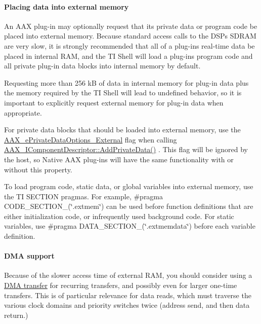 \hypertarget{a00362_subsubsection__placing_data_into_external_memory_}{}\paragraph{Placing data into external memory}\label{a00362_subsubsection__placing_data_into_external_memory_}
 An A\+A\+X plug-\/in may optionally request that its private data or program code be placed into external memory. Because standard access calls to the D\+S\+P\textquotesingle{}s S\+D\+R\+A\+M are very slow, it is strongly recommended that all of a plug-\/in\textquotesingle{}s real-\/time data be placed in internal R\+A\+M, and the T\+I Shell will load a plug-\/in\textquotesingle{}s program code and all private plug-\/in data blocks into internal memory by default.

Requesting more than 256 k\+B of data in internal memory for plug-\/in data plus the memory required by the T\+I Shell will lead to undefined behavior, so it is important to explicitly request external memory for plug-\/in data when appropriate.

For private data blocks that should be loaded into external memory, use the \hyperlink{a00206_a9f1ef2cb64daf30eaf145dfbb8cd0d00a75aef62fea40f9bba18502add99130b2}{A\+A\+X\+\_\+e\+Private\+Data\+Options\+\_\+\+External} flag when calling \hyperlink{a00088_a125949841a13e97ff93fa321f2050433}{A\+A\+X\+\_\+\+I\+Component\+Descriptor\+::\+Add\+Private\+Data()} . This flag will be ignored by the host, so Native A\+A\+X plug-\/ins will have the same functionality with or without this property.

To load program code, static data, or global variables into external memory, use the {\ttfamily T\+I S\+E\+C\+T\+I\+O\+N} pragmas. For example, {\ttfamily \#pragma C\+O\+D\+E\+\_\+\+S\+E\+C\+T\+I\+O\+N\+\_\+(\char`\"{}.\+extmem\char`\"{})} can be used before function definitions that are either initialization code, or infrequently used background code. For static variables, use {\ttfamily \#pragma D\+A\+T\+A\+\_\+\+S\+E\+C\+T\+I\+O\+N\+\_\+(\char`\"{}.\+extmemdata\char`\"{})} before each variable definition.

\hypertarget{a00362_subsubsection__dma_support_}{}\paragraph{D\+M\+A support}\label{a00362_subsubsection__dma_support_}
 Because of the slower access time of external R\+A\+M, you should consider using a \hyperlink{a00340}{D\+M\+A transfer} for recurring transfers, and possibly even for larger one-\/time transfers. This is of particular relevance for data reads, which must traverse the various clock domains and priority switches twice (address send, and then data return.)

